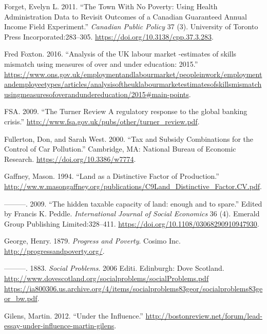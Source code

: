 \documentclass[]{tufte-handout}
\begin{document}
\leavevmode\hypertarget{ref-Forget2011}{}%
Forget, Evelyn L. 2011. ``The Town With No Poverty: Using Health
Administration Data to Revisit Outcomes of a Canadian Guaranteed Annual
Income Field Experiment.'' \emph{Canadian Public Policy} 37 (3).
University of Toronto Press Incorporated:283--305.
\url{https://doi.org/10.3138/cpp.37.3.283}.

\leavevmode\hypertarget{ref-FredFoxton2016}{}%
Fred Foxton. 2016. ``Analysis of the UK labour market -estimates of
skills mismatch using measures of over and under education: 2015.''
\url{https://www.ons.gov.uk/employmentandlabourmarket/peopleinwork/employmentandemployeetypes/articles/analysisoftheuklabourmarketestimatesofskillsmismatchusingmeasuresofoverandundereducation/2015\#main-points}.

\leavevmode\hypertarget{ref-FSA2009}{}%
FSA. 2009. ``The Turner Review A regulatory response to the global
banking crisis.''
\url{http://www.fsa.gov.uk/pubs/other/turner_review.pdf}.

\leavevmode\hypertarget{ref-Fullerton2000}{}%
Fullerton, Don, and Sarah West. 2000. ``Tax and Subsidy Combinations for
the Control of Car Pollution.'' Cambridge, MA: National Bureau of
Economic Research. \url{https://doi.org/10.3386/w7774}.

\leavevmode\hypertarget{ref-Gaffney1994}{}%
Gaffney, Mason. 1994. ``Land as a Distinctive Factor of Production.''
\url{http://ww.w.masongaffney.org/publications/C9Land_Distinctive_Factor.CV.pdf}.

\leavevmode\hypertarget{ref-Gaffney2009}{}%
---------. 2009. ``The hidden taxable capacity of land: enough and to
spare.'' Edited by Francis K. Peddle. \emph{International Journal of
Social Economics} 36 (4). Emerald Group Publishing Limited:328--411.
\url{https://doi.org/10.1108/03068290910947930}.

\leavevmode\hypertarget{ref-George1879}{}%
George, Henry. 1879. \emph{Progress and Poverty}. Cosimo Inc.
\url{http://progressandpoverty.org/}.

\leavevmode\hypertarget{ref-George}{}%
---------. 1883. \emph{Social Problems}. 2006 Editi. Edinburgh: Dove
Scotland.
\href{http://www.dovescotland.org/socialproblems/socialProblems.pdf\%20https://ia800306.us.archive.org/4/items/socialproblems83geor/socialproblems83geor_bw.pdf}{http://www.dovescotland.org/socialproblems/socialProblems.pdf https://ia800306.us.archive.org/4/items/socialproblems83geor/socialproblems83geor\_bw.pdf}.

\leavevmode\hypertarget{ref-Gilens2012}{}%
Gilens, Martin. 2012. ``Under the Influence.''
\url{http://bostonreview.net/forum/lead-essay-under-influence-martin-gilens}.
\end{document}
